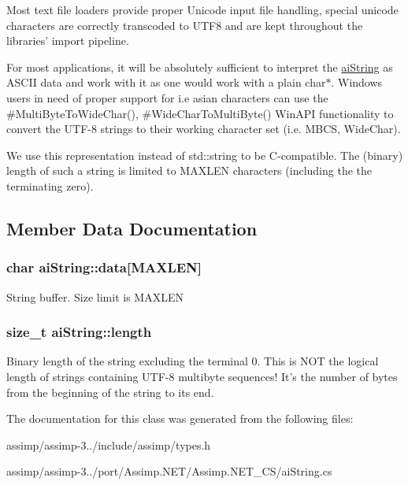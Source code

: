 Most text file loaders provide proper Unicode input file handling, special unicode characters are correctly transcoded to U\+T\+F8 and are kept throughout the libraries' import pipeline.

For most applications, it will be absolutely sufficient to interpret the \hyperlink{structai_string}{ai\+String} as A\+S\+C\+I\+I data and work with it as one would work with a plain char$\ast$. Windows users in need of proper support for i.\+e asian characters can use the \#\+Multi\+Byte\+To\+Wide\+Char(), \#\+Wide\+Char\+To\+Multi\+Byte() Win\+A\+P\+I functionality to convert the U\+T\+F-\/8 strings to their working character set (i.\+e. M\+B\+C\+S, Wide\+Char).

We use this representation instead of std\+::string to be C-\/compatible. The (binary) length of such a string is limited to M\+A\+X\+L\+E\+N characters (including the the terminating zero). 

\subsection{Member Data Documentation}
\hypertarget{structai_string_aa90b1da7d347a3dcca0a95061e6ea41d}{
\subsubsection[{data}]{\setlength{\rightskip}{0pt plus 5cm}char ai\+String\+::data\mbox{[}M\+A\+X\+L\+E\+N\mbox{]}}}\label{structai_string_aa90b1da7d347a3dcca0a95061e6ea41d}
String buffer. Size limit is M\+A\+X\+L\+E\+N \hypertarget{structai_string_a7d77c2031ff0340746aa046f7fbcf313}{
\subsubsection[{length}]{\setlength{\rightskip}{0pt plus 5cm}size\+\_\+t ai\+String\+::length}}\label{structai_string_a7d77c2031ff0340746aa046f7fbcf313}
Binary length of the string excluding the terminal 0. This is N\+O\+T the logical length of strings containing U\+T\+F-\/8 multibyte sequences! It's the number of bytes from the beginning of the string to its end. 

The documentation for this class was generated from the following files\+:\begin{DoxyCompactItemize}
\item 
assimp/assimp-\/3../include/assimp/types.\+h\item 
assimp/assimp-\/3../port/\+Assimp.\+N\+E\+T/\+Assimp.\+N\+E\+T\+\_\+\+C\+S/ai\+String.\+cs\end{DoxyCompactItemize}
